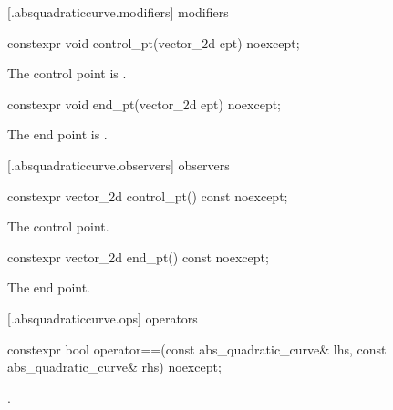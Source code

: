  [\iotwod.absquadraticcurve.modifiers]{ modifiers}

%
\begin{itemdecl}
constexpr void control_pt(vector_2d cpt) noexcept;
\end{itemdecl}
\begin{itemdescr}
\pnum
\effects
The control point is .
\end{itemdescr}

%
\begin{itemdecl}
constexpr void end_pt(vector_2d ept) noexcept;
\end{itemdecl}
\begin{itemdescr}
\pnum
\effects
The end point is .
\end{itemdescr}

 [\iotwod.absquadraticcurve.observers]{ observers}

%
\begin{itemdecl}
constexpr vector_2d control_pt() const noexcept;
\end{itemdecl}
\begin{itemdescr}
\pnum
\returns
The control point.
\end{itemdescr}

%
\begin{itemdecl}
constexpr vector_2d end_pt() const noexcept;
\end{itemdecl}
\begin{itemdescr}
\pnum
\returns
The end point.
\end{itemdescr}

 [\iotwod.absquadraticcurve.ops]{ operators}

%
\begin{itemdecl}
constexpr bool operator==(const abs_quadratic_curve& lhs,
  const abs_quadratic_curve& rhs) noexcept;
\end{itemdecl}
\begin{itemdescr}
\pnum
\returns
{}.
\end{itemdescr}
